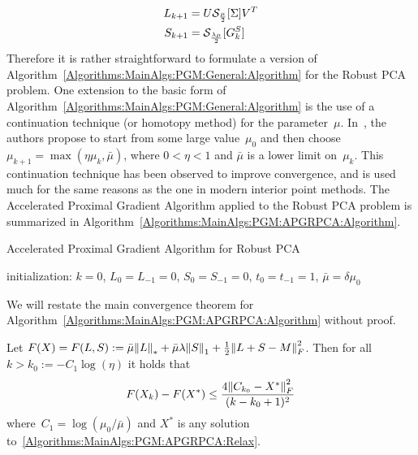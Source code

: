\begin{align}
L_{k+1} &= U {\mathcal{S}}_\frac{\mu}{2}[\Sigma] V^T \label{Algorithms:MainAlgs:PGM:APGRPCA:LIterate} \\
S_{k+1} &= {\mathcal{S}}_\frac{\lambda\mu}{2}[G_k^S] \label{Algorithms:MainAlgs:PGM:APGRPCA:SIterate}
\end{align}
Therefore it is rather straightforward to formulate a version of Algorithm~\ref{Algorithms:MainAlgs:PGM:General:Algorithm} for the Robust PCA problem. One extension to the basic form of Algorithm~\ref{Algorithms:MainAlgs:PGM:General:Algorithm} is the use of a continuation technique (or homotopy method) for the parameter~$\mu$. In~\cite{Lin:2009kx}, the authors propose to start from some large value~$\mu_0$ and then choose~$\mu_{k+1} = \max(\eta \mu_k,\bar{\mu})$, where $0<\eta<1$ and $\bar{\mu}$ is a lower limit on~$\mu_k$. This continuation technique has been observed to improve convergence, and is used much for the same reasons as the one in modern interior point methods. The Accelerated Proximal Gradient Algorithm applied to the Robust PCA problem is summarized in Algorithm~\ref{Algorithms:MainAlgs:PGM:APGRPCA:Algorithm}.
%
\begin{algorithm}
\caption{Accelerated Proximal Gradient Algorithm for Robust PCA}
initialization: $k=0$, $L_0=L_{-1}=0$, $S_0=S_{-1}= 0$, $t_0=t_{-1} = 1$, $\bar{\mu} = \delta \mu_0$\;
\label{Algorithms:MainAlgs:PGM:APGRPCA:Algorithm}
\end{algorithm}

We will restate the main convergence theorem for Algorithm~\ref{Algorithms:MainAlgs:PGM:APGRPCA:Algorithm} without proof.\\ 

\begin{theorem}
\label{Algorithms:MainAlgs:PGM:APGRPCA:ConvThm}
Let $F(X) = F(L,S) := \bar{\mu} {\left\|L\right\|}_{*}^{} + \bar{\mu} \lambda {\left\|S\right\|}_{1}^{} + \frac{1}{2} {\left\|L+S-M\right\|}_{F}^{2}$. Then for all $k>k_0 := -C_1\log(\eta)$ it holds that
\begin{align*}
F(X_k) - F(X^*) \leq \frac{4{\left\|C_{k_0}-X^*\right\|}_{F}^{2}}{(k-k_0+1)^2}
\end{align*}
where~$C_1 = \log(\mu_0/\bar{\mu})$ and $X^*$ is any solution to~\eqref{Algorithms:MainAlgs:PGM:APGRPCA:Relax}.\\
\end{theorem}


